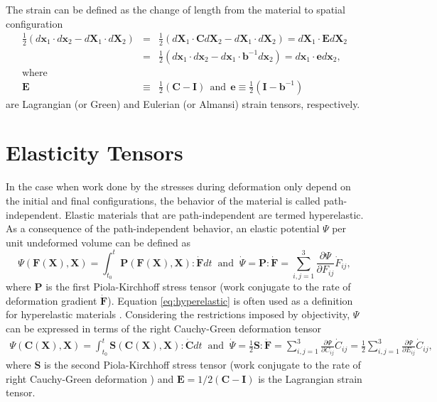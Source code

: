 The strain can be defined as the change of length from the material to spatial configuration
%
\begin{eqnarray}
\frac{1}{2}\left(d\pmb{x}_1 \cdot d\pmb{x}_2 - d\pmb{X}_1 \cdot d\pmb{X}_2 \right) &=& \frac{1}{2}\left(d\pmb{X}_1 \cdot \pmb{C} d\pmb{X}_2 - d\pmb{X}_1 \cdot d\pmb{X}_2 \right) = d\pmb{X}_1 \cdot \pmb{E} d\pmb{X}_2 \nonumber\\
%
&=& \frac{1}{2}\left(d\pmb{x}_1 \cdot d\pmb{x}_2 - d\pmb{x}_1 \cdot \pmb{b}^{-1} d\pmb{x}_2\right) = d\pmb{x}_1 \cdot \pmb{e} d\pmb{x}_2, \nonumber\\
%
\text{where}&&\nonumber\\
%
\pmb{E} &\equiv& \frac{1}{2} \left(\pmb{C} - \pmb{I} \right) \ \ \text{and} \ \ \pmb{e} \equiv \frac{1}{2}\left(\pmb{I} - \pmb{b}^{-1}\right)
\end{eqnarray}
%
are Lagrangian (or Green) and Eulerian (or Almansi) strain tensors, respectively.

\section{Elasticity Tensors}

In the case when work done by the stresses during deformation only depend on the initial and final configurations, the behavior of the material is called path-independent. Elastic materials that are path-independent are termed hyperelastic. As a consequence of the path-independent behavior, an elastic potential $\Psi$ per unit undeformed volume can be defined as
%
\begin{equation}
\Psi(\pmb{F}(\pmb{X}),\pmb{X}) = \int_{t_0}^t \pmb{P}(\pmb{F}(\pmb{X}),\pmb{X}):\dot{\pmb{F}}dt \ \text{ and } \ \dot{\Psi} = \pmb{P} : \dot{\pmb{F}} = \sum_{i,j=1}^3\frac{\partial \Psi}{\partial F_{ij}}\dot{F}_{ij},
\label{eq:hyperelastic}
\end{equation}
%  
where $\pmb{P}$ is the first Piola-Kirchhoff stress tensor (work conjugate to the rate of deformation gradient $\dot{\pmb{F}}$). Equation \eqref{eq:hyperelastic} is often used as a definition for hyperelastic materials \cite{JavierBonet:2008uxa}. Considering the restrictions imposed by objectivity, $\Psi$ can be expressed in terms of the right Cauchy-Green deformation tensor 
%
\begin{eqnarray}
\Psi(\pmb{C}(\pmb{X}),\pmb{X}) = \int_{t_0}^t \pmb{S}(\pmb{C}(\pmb{X}),\pmb{X}) : \dot{\pmb{C}} dt \ \text{ and } \ \dot{\Psi} =  \frac{1}{2}\pmb{S}:\dot{\pmb{F}} = \sum_{i,j=1}^3\frac{\partial \Psi}{\partial C_{ij}}\dot{C}_{ij} = \frac{1}{2} \sum_{i,j=1}^3\frac{\partial \Psi}{\partial E_{ij}}\dot{C}_{ij}, 
\end{eqnarray}
%
where $\pmb{S}$ is the second Piola-Kirchhoff stress tensor (work conjugate to the rate of right Cauchy-Green deformation ) and $\pmb{E} = 1/2(\pmb{C}-\pmb{I})$ is the Lagrangian strain tensor.

